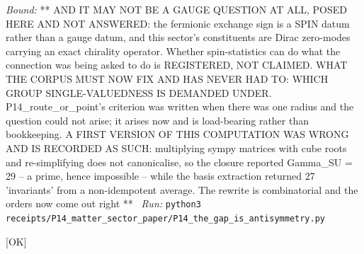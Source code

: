 \begin{description}
 \emph{Bound:} ** AND IT MAY NOT BE A GAUGE QUESTION AT ALL, POSED HERE AND NOT ANSWERED: the fermionic exchange sign is a SPIN datum rather than a gauge datum, and this sector's constituents are Dirac zero-modes carrying an exact chirality operator. Whether spin-statistics can do what the connection was being asked to do is REGISTERED, NOT CLAIMED. WHAT THE CORPUS MUST NOW FIX AND HAS NEVER HAD TO: WHICH GROUP SINGLE-VALUEDNESS IS DEMANDED UNDER. P14\_route\_or\_point's criterion was written when there was one radius and the question could not arise; it arises now and is load-bearing rather than bookkeeping. A FIRST VERSION OF THIS COMPUTATION WAS WRONG AND IS RECORDED AS SUCH: multiplying sympy matrices with cube roots and re-simplifying does not canonicalise, so the closure reported \textbar{}Gamma\_SU\textbar{} = 29 -- a prime, hence impossible -- while the basis extraction returned 27 'invariants' from a non-idempotent average. The rewrite is combinatorial and the orders now come out right **
\ \emph{Run:} \texttt{python3 receipts/P14\_matter\_sector\_paper/P14\_the\_gap\_is\_antisymmetry.py}
\item[\label{rcpt:P14_no_choice_of_group_works}\texttt{P14\_no\_choice\_of\_group\_works}]\hfill\textsf{[OK]}\\

\end{description}
